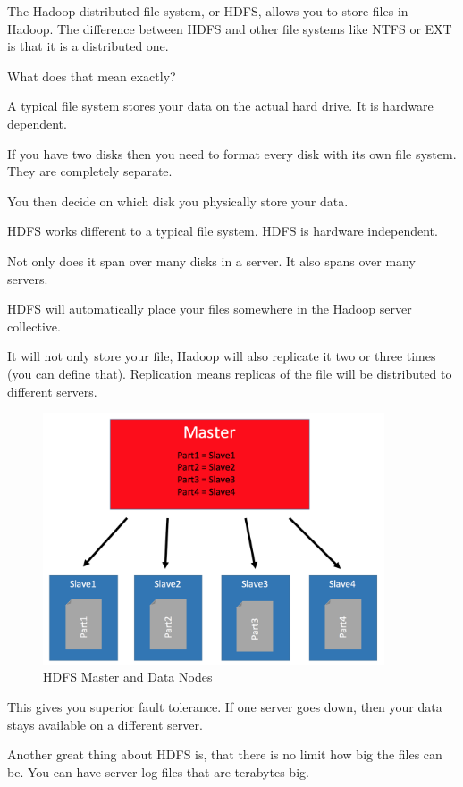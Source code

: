\documentclass[12pt, numbers=noenddot]{scrreprt} %
\begin{document}
The Hadoop distributed file system, or HDFS, allows you to store files in Hadoop. The difference between HDFS and other file systems like NTFS or EXT is that it is a distributed one.

What does that mean exactly?

A typical file system stores your data on the actual hard drive. It is hardware dependent.

If you have two disks then you need to format every disk with its own file system. They are completely separate.

You then decide on which disk you physically store your data.

HDFS works different to a typical file system. HDFS is hardware independent.

Not only does it span over many disks in a server. It also spans over many servers.

HDFS will automatically place your files somewhere in the Hadoop server collective.

It will not only store your file, Hadoop will also replicate it two or three times (you can define that). Replication means replicas of the file will be distributed to different servers.

\begin{figure}[htbp]
  \centering
     \includegraphics[width=0.9\textwidth]{images/HDFS-Master-DataNodes}
  \caption{HDFS Master and Data Nodes}
  \label{fig:Bild1}
\end{figure}

This gives you superior fault tolerance. If one server goes down, then your data stays available on a different server.

Another great thing about HDFS is, that there is no limit how big the files can be. You can have server log files that are terabytes big.
\end{document}
